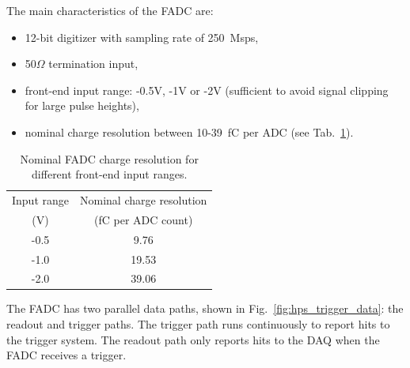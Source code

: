 
The main characteristics of the FADC are:
\begin{itemize}
\item 12-bit digitizer with sampling rate of 250~Msps, 
\item 50$\Omega$ termination input, 
\item front-end input range:  -0.5V, -1V or -2V (sufficient to avoid signal clipping for large pulse heights),
\item nominal charge resolution between 10-39~fC per ADC (see Tab.~\ref{tab:charge_resolution}).
\end{itemize}
\begin{table}[h]
\centering
\begin{tabular}{|c|c|}
\hline
Input range & Nominal charge resolution\\
(V) & (fC per ADC count)\\\hline
-0.5 & 9.76  \\\hline
-1.0 & 19.53  \\\hline
-2.0 & 39.06 \\\hline
\end{tabular}
\caption{Nominal FADC charge resolution for different front-end input ranges.}
\label{tab:charge_resolution}
\end{table}
The FADC has two parallel data paths, shown in Fig.~\ref{fig:hps_trigger_data}: the readout and trigger paths. The trigger path runs continuously to report hits to the trigger system. The readout path only reports hits to the DAQ when the FADC receives a trigger.

